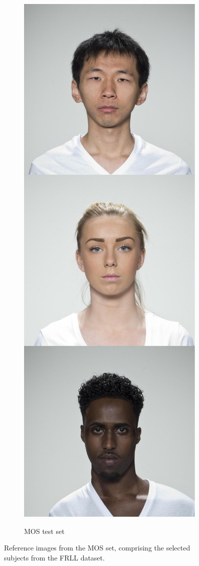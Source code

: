 \begin{figure}
\begin{subfigure}{0.19\textwidth}
        \includegraphics[width=\textwidth]{images/mos_test_set.pdf}\\
        \caption{MOS test set}\label{fig:mos_set_test}
    \end{subfigure}
    \caption{Reference images from the MOS set, comprising the selected subjects from the FRLL dataset.}\label{fig:mos_set}
\end{figure}

